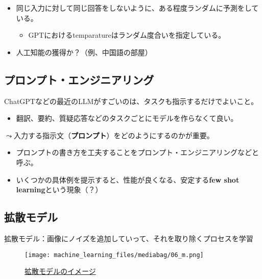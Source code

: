 \documentclass[
  xelatex,
  ja=standard]{bxjsarticle}
\providecommand{\tightlist}{%
  \setlength{\itemsep}{0pt}\setlength{\parskip}{0pt}}\usepackage{longtable,booktabs,array}
\begin{document}
\begin{itemize}
\tightlist
\item
  同じ入力に対して同じ回答をしないように、ある程度ランダムに予測をしている。

  \begin{itemize}
  \tightlist
  \item
    GPTにおけるtemparatureはランダム度合いを指定している。
  \end{itemize}
\item
  人工知能の獲得か？（例、中国語の部屋）
\end{itemize}

\hypertarget{ux30d7ux30edux30f3ux30d7ux30c8ux30a8ux30f3ux30b8ux30cbux30a2ux30eaux30f3ux30b0}{%
\subsection{プロンプト・エンジニアリング}\label{ux30d7ux30edux30f3ux30d7ux30c8ux30a8ux30f3ux30b8ux30cbux30a2ux30eaux30f3ux30b0}}

ChatGPTなどの最近のLLMがすごいのは、タスクも指示するだけでよいこと。

\begin{itemize}
\tightlist
\item
  翻訳、要約、質疑応答などのタスクごとにモデルを作らなくて良い。
\end{itemize}

\(\leadsto\)入力する指示文（\textbf{プロンプト}）をどのようにするのかが重要。

\begin{itemize}
\tightlist
\item
  プロンプトの書き方を工夫することをプロンプト・エンジニアリングなどと呼ぶ。
\item
  いくつかの具体例を提示すると、性能が良くなる、安定する\textbf{few shot
  learning}という現象（？）
\end{itemize}

\hypertarget{ux62e1ux6563ux30e2ux30c7ux30eb}{%
\subsection{拡散モデル}\label{ux62e1ux6563ux30e2ux30c7ux30eb}}

拡散モデル：画像にノイズを追加していって、それを取り除くプロセスを学習

\begin{figure}[htpb]

{\centering \texttt{[image: machine\_learning\_files/mediabag/06\_m.png]}

}

\caption{\href{https://gigazine.net/news/20221006-visuals-explaining-stable-diffusion/}{拡散モデルのイメージ}}

\end{figure}
\end{document}
